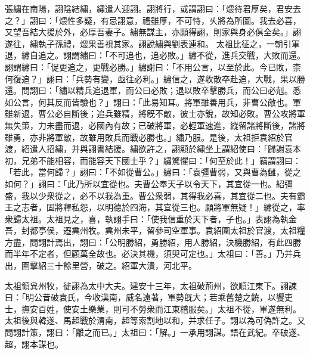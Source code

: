 \begin{pinyinscope}
 
張繡在南陽，詡陰結繡，繡遣人迎詡。詡將行，或謂詡曰：「煨待君厚矣，君安去之？」詡曰：「煨性多疑，有忌詡意，禮雖厚，不可恃，乆將為所圖。我去必喜，又望吾結大援於外，必厚吾妻子。繡無謀主，亦願得詡，則家與身必俱全矣。」詡遂往，繡執子孫禮，煨果善視其家。詡說繡與劉表連和。
 太祖比征之，一朝引軍退，繡自追之。詡謂繡曰：「不可追也，追必敗。」繡不從，進兵交戰，大敗而還。詡謂繡曰：「促更追之，更戰必勝。」繡謝曰：「不用公言，以至於此。今已敗，柰何復追？」詡曰：「兵勢有變，亟往必利。」繡信之，遂收散卒赴追，大戰，果以勝還。問詡曰：「繡以精兵追退軍，而公曰必敗；退以敗卒擊勝兵，而公曰必剋。悉如公言，何其反而皆驗也？」詡曰：「此易知耳。將軍雖善用兵，非曹公敵也。軍雖新退，曹公必自斷後；追兵雖精，將旣不敵，彼士亦銳，故知必敗。曹公攻將軍無失策，力未盡而退，必國內有故；已破將軍，必輕軍速進，縱留諸將斷後，諸將雖勇，亦非將軍敵，故雖用敗兵而戰必勝也。」繡乃服。是後，太祖拒袁紹於官渡，紹遣人招繡，并與詡書結援。繡欲許之，詡顯於繡坐上謂紹使曰：「歸謝袁本初，兄弟不能相容，而能容天下國士乎？」繡驚懼曰：「何至於此！」竊謂詡曰：「若此，當何歸？」詡曰：「不如從曹公。」繡曰：「袁彊曹弱，又與曹為讎，從之如何？」詡曰：「此乃所以宜從也。夫曹公奉天子以令天下，其宜從一也。紹彊盛，我以少衆從之，必不以我為重。曹公衆弱，其得我必喜，其宜從二也。夫有霸王之志者，固將釋私怨，以明德於四海，其宜從三也。願將軍無疑！」繡從之，率衆歸太祖。太祖見之，喜，執詡手曰：「使我信重於天下者，子也。」表詡為執金吾，封都亭侯，遷兾州牧。兾州未平，留參司空軍事。袁紹圍太祖於官渡，太祖糧方盡，問詡計焉出，詡曰：「公明勝紹，勇勝紹，用人勝紹，決機勝紹，有此四勝而半年不定者，但顧萬全故也。必決其機，須臾可定也。」太祖曰：「善。」乃并兵出，圍擊紹三十餘里營，破之。紹軍大潰，河北平。
 
 
太祖領兾州牧，徙詡為太中大夫。建安十三年，太祖破荊州，欲順江東下。詡諫曰：「明公昔破袁氏，今收漢南，威名遠著，軍勢旣大；若乘舊楚之饒，以饗吏士，撫安百姓，使安土樂業，則可不勞衆而江東稽服矣。」太祖不從，軍遂無利。
 太祖後與韓遂、馬超戰於渭南，超等索割地以和，并求任子。詡以為可偽許之。又問詡計策，詡曰：「離之而已。」太祖曰：「解。」一承用詡謀。語在武紀。卒破遂、超，詡本謀也。
 

\end{pinyinscope}
